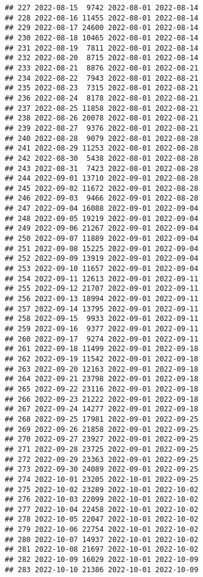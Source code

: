 \documentclass[
]{article}
\begin{document}
\begin{verbatim}
## 227 2022-08-15  9742 2022-08-01 2022-08-14
## 228 2022-08-16 11455 2022-08-01 2022-08-14
## 229 2022-08-17 24600 2022-08-01 2022-08-14
## 230 2022-08-18 10465 2022-08-01 2022-08-14
## 231 2022-08-19  7811 2022-08-01 2022-08-14
## 232 2022-08-20  8715 2022-08-01 2022-08-14
## 233 2022-08-21  8876 2022-08-01 2022-08-21
## 234 2022-08-22  7943 2022-08-01 2022-08-21
## 235 2022-08-23  7315 2022-08-01 2022-08-21
## 236 2022-08-24  8178 2022-08-01 2022-08-21
## 237 2022-08-25 11858 2022-08-01 2022-08-21
## 238 2022-08-26 20078 2022-08-01 2022-08-21
## 239 2022-08-27  9376 2022-08-01 2022-08-21
## 240 2022-08-28  9079 2022-08-01 2022-08-28
## 241 2022-08-29 11253 2022-08-01 2022-08-28
## 242 2022-08-30  5438 2022-08-01 2022-08-28
## 243 2022-08-31  7423 2022-08-01 2022-08-28
## 244 2022-09-01 13710 2022-09-01 2022-08-28
## 245 2022-09-02 11672 2022-09-01 2022-08-28
## 246 2022-09-03  9466 2022-09-01 2022-08-28
## 247 2022-09-04 16088 2022-09-01 2022-09-04
## 248 2022-09-05 19219 2022-09-01 2022-09-04
## 249 2022-09-06 21267 2022-09-01 2022-09-04
## 250 2022-09-07 11889 2022-09-01 2022-09-04
## 251 2022-09-08 15225 2022-09-01 2022-09-04
## 252 2022-09-09 13919 2022-09-01 2022-09-04
## 253 2022-09-10 11657 2022-09-01 2022-09-04
## 254 2022-09-11 12613 2022-09-01 2022-09-11
## 255 2022-09-12 21707 2022-09-01 2022-09-11
## 256 2022-09-13 18994 2022-09-01 2022-09-11
## 257 2022-09-14 13795 2022-09-01 2022-09-11
## 258 2022-09-15  9933 2022-09-01 2022-09-11
## 259 2022-09-16  9377 2022-09-01 2022-09-11
## 260 2022-09-17  9274 2022-09-01 2022-09-11
## 261 2022-09-18 11499 2022-09-01 2022-09-18
## 262 2022-09-19 11542 2022-09-01 2022-09-18
## 263 2022-09-20 12163 2022-09-01 2022-09-18
## 264 2022-09-21 23798 2022-09-01 2022-09-18
## 265 2022-09-22 23116 2022-09-01 2022-09-18
## 266 2022-09-23 21222 2022-09-01 2022-09-18
## 267 2022-09-24 14277 2022-09-01 2022-09-18
## 268 2022-09-25 17981 2022-09-01 2022-09-25
## 269 2022-09-26 21858 2022-09-01 2022-09-25
## 270 2022-09-27 23927 2022-09-01 2022-09-25
## 271 2022-09-28 23725 2022-09-01 2022-09-25
## 272 2022-09-29 23363 2022-09-01 2022-09-25
## 273 2022-09-30 24089 2022-09-01 2022-09-25
## 274 2022-10-01 23205 2022-10-01 2022-09-25
## 275 2022-10-02 23289 2022-10-01 2022-10-02
## 276 2022-10-03 22099 2022-10-01 2022-10-02
## 277 2022-10-04 22458 2022-10-01 2022-10-02
## 278 2022-10-05 22047 2022-10-01 2022-10-02
## 279 2022-10-06 22754 2022-10-01 2022-10-02
## 280 2022-10-07 14937 2022-10-01 2022-10-02
## 281 2022-10-08 21697 2022-10-01 2022-10-02
## 282 2022-10-09 16029 2022-10-01 2022-10-09
## 283 2022-10-10 21386 2022-10-01 2022-10-09

\end{verbatim}
\end{document}
